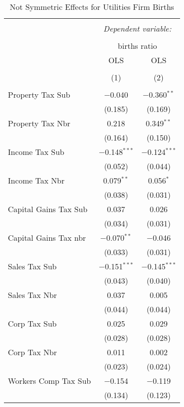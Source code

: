 
\begin{table}[!htbp] \centering 
  \caption{Not Symmetric Effects for  Utilities Firm Births} 
  \label{} 
\begin{tabular}{@{\extracolsep{5pt}}lcc} 
\\[-1.8ex]\hline 
\hline \\[-1.8ex] 
 & \multicolumn{2}{c}{\textit{Dependent variable:}} \\ 
\cline{2-3} 
\\[-1.8ex] & \multicolumn{2}{c}{births ratio} \\ 
 & OLS & OLS \\ 
\\[-1.8ex] & (1) & (2)\\ 
\hline \\[-1.8ex] 
 Property Tax Sub & $-$0.040 & $-$0.360$^{**}$ \\ 
  & (0.185) & (0.169) \\ 
  Property Tax Nbr & 0.218 & 0.349$^{**}$ \\ 
  & (0.164) & (0.150) \\ 
  Income Tax Sub & $-$0.148$^{***}$ & $-$0.124$^{***}$ \\ 
  & (0.052) & (0.044) \\ 
  Income Tax Nbr & 0.079$^{**}$ & 0.056$^{*}$ \\ 
  & (0.038) & (0.031) \\ 
  Capital Gains Tax Sub & 0.037 & 0.026 \\ 
  & (0.034) & (0.031) \\ 
  Capital Gains Tax nbr & $-$0.070$^{**}$ & $-$0.046 \\ 
  & (0.033) & (0.031) \\ 
  Sales Tax Sub & $-$0.151$^{***}$ & $-$0.145$^{***}$ \\ 
  & (0.043) & (0.040) \\ 
  Sales Tax Nbr & 0.037 & 0.005 \\ 
  & (0.044) & (0.044) \\ 
  Corp Tax Sub & 0.025 & 0.029 \\ 
  & (0.028) & (0.028) \\ 
  Corp Tax Nbr & 0.011 & 0.002 \\ 
  & (0.023) & (0.024) \\ 
  Workers Comp Tax Sub & $-$0.154 & $-$0.119 \\ 
  & (0.134) & (0.123) \\ 

\end{tabular}
\end{table}
